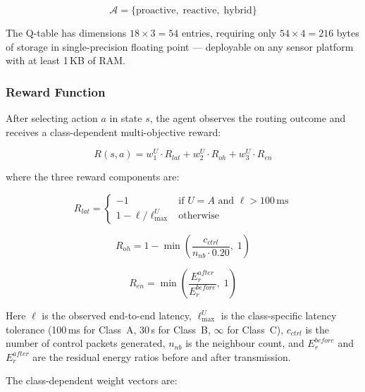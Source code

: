 \documentclass[12pt]{article}
\begin{document}
\begin{equation}
\mathcal{A} = \{\text{proactive},\; \text{reactive},\; \text{hybrid}\}
\label{eq:actions}
\end{equation}

The Q-table has dimensions $18 \times 3 = 54$ entries, requiring
only $54 \times 4 = 216$ bytes of storage in single-precision
floating point --- deployable on any sensor platform with at least
1\,KB of RAM.

\subsubsection{Reward Function}

After selecting action $a$ in state $s$, the agent observes the
routing outcome and receives a class-dependent multi-objective reward:

\begin{equation}
R(s, a) = w_1^U \cdot R_{lat} + w_2^U \cdot R_{oh} + w_3^U \cdot R_{en}
\label{eq:reward}
\end{equation}

where the three reward components are:

\begin{equation}
R_{lat} = \begin{cases}
-1 & \text{if } U = A \text{ and } \ell > 100\,\text{ms} \\
1 - \ell / \ell_{\max}^U & \text{otherwise}
\end{cases}
\label{eq:rlat}
\end{equation}

\begin{equation}
R_{oh} = 1 - \min\!\left(\frac{c_{ctrl}}{n_{nb} \cdot 0.20},\; 1\right)
\label{eq:roh}
\end{equation}

\begin{equation}
R_{en} = \min\!\left(\frac{E_r^{after}}{E_r^{before}},\; 1\right)
\label{eq:ren}
\end{equation}

Here $\ell$ is the observed end-to-end latency, $\ell_{\max}^U$ is
the class-specific latency tolerance (100\,ms for Class~A, 30\,s for
Class~B, $\infty$ for Class~C), $c_{ctrl}$ is the number of control
packets generated, $n_{nb}$ is the neighbour count, and $E_r^{before}$
and $E_r^{after}$ are the residual energy ratios before and after
transmission.

The class-dependent weight vectors are:
\end{document}
